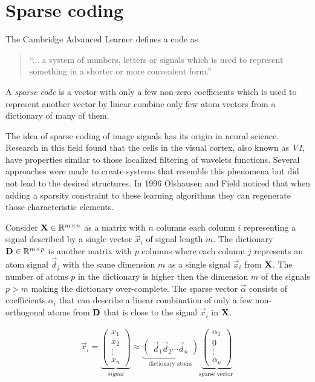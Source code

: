 \chapter{Sparse coding}
\label{chap:sparse_coding}

The Cambridge Advanced Learner defines a code as
\begin{quotation}
``... a system of numbers, letters or signals which is used to represent
something in a shorter or more convenient form.''
\end{quotation}
A \emph{sparse code} is a vector with only a few non-zero coefficients
which is used to represent another vector by linear combine only few atom
vectors from a dictionary of many of them.

The idea of sparse coding of image signals has its origin in neural science. 
Research in this field found that the cells in the visual cortex, also known as
\emph{V1}, have properties similar to those localized filtering of wavelets
functions. Several approaches were made to create systems that resemble this
phenomena but did not lead to the desired structures. In 1996 Olshausen and
Field\cite{Olshausen1996} noticed that when adding a sparsity constraint to
these learning algorithms they can regenerate those characteristic elements.

\newpage %
Consider $\boldsymbol{\mathrm{X}} \in \mathbb{R}^{m\times n}$  as a matrix with $n$ columns each
column $i$ representing a signal described by a single vector $\vec{x}_{i}$ of
signal length $m$. The dictionary $\boldsymbol{\mathrm{D}}\in\mathbb{R}^{m \times p}$ is another
matrix with $p$ columns where each column $j$ represents an atom signal
$\vec{d}_j$ with the same dimension $m$ as a single signal $\vec{x}_{i}$ from
$\boldsymbol{\mathrm{X}}$. The number of atoms $p$ in the dictionary is higher then the
dimension $m$ of the signals $p > m$ making the dictionary over-complete. The
sparse vector $\vec{\alpha}$ consists of coefficients $\alpha_i$ that can
describe a linear
combination of only a few non-orthogonal atoms from $\boldsymbol{\mathrm{D}}$ that is close to
the signal $\vec{x}_i $ in $\boldsymbol{\mathrm{X}}$. 

\begin{align}
\vec{x}_i = \underbrace{\begin{pmatrix} x_1 \\ x_2 \\ \vdots \\ x_n
\end{pmatrix}}_{signal}
\approx \underbrace{\begin{pmatrix} \vec{d}_1  \vec{d}_2 \cdots \vec{d}_n
\end{pmatrix}}_{\textrm{dictionary atoms}}
\underbrace{\begin{pmatrix} \alpha_1 \\ 0 \\ \vdots \\ \alpha_n
\end{pmatrix}}_{\textrm{sparse vector }}
\end{align}

